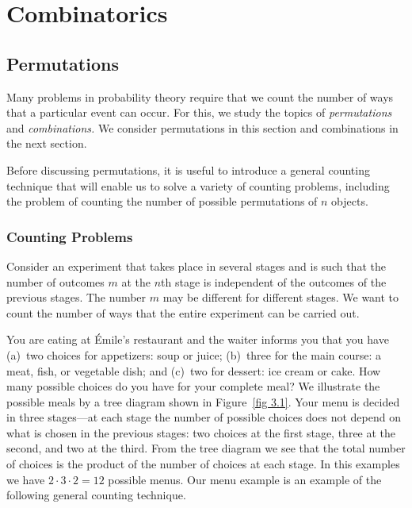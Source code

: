 \chapter{Combinatorics}\label{chp 3} 

\section{Permutations}\label{sec 3.1}

Many problems in probability theory require that we count the number of ways that a
particular event can occur.  For this, we study the topics of {\em permutations} and
{\em combinations.}  We consider permutations in this section and combinations in the
next section.

Before discussing permutations, it is useful to introduce a general counting technique
that will enable us to solve a variety of counting problems, including the problem of
counting the number of possible permutations of $n$ objects.
 
\subsection*{Counting Problems}

Consider an experiment that takes place in several stages and is such that the number
of outcomes $m$ at the $n$th stage is independent of the outcomes of the previous
stages.  The number $m$ may be different for different stages.  We want to count the
number of ways that the entire experiment can be carried out.

\begin{example}\label{exam 3.1} You are eating at \'Emile's restaurant and the waiter informs you that you have (a)~two choices for appetizers:
soup or juice;  (b)~three for the main course: a meat, fish, or vegetable dish; and
(c)~two for dessert:  ice cream or cake.  How many possible choices do you have for your
complete meal?  We illustrate  the possible meals by a tree diagram shown in
Figure~\ref{fig 3.1}.  Your menu is decided in three stages---at each stage the number
of possible choices does not depend on what is chosen in the previous stages: two
choices at the first stage, three at the second, and two at the third.  From the tree
diagram we see that the total number of choices is the product of the number of choices
at each stage.  In this examples we have $2 \cdot 3 \cdot 2 = 12$ possible menus.  Our
menu example is an example of the following general counting technique.
\end{example}

